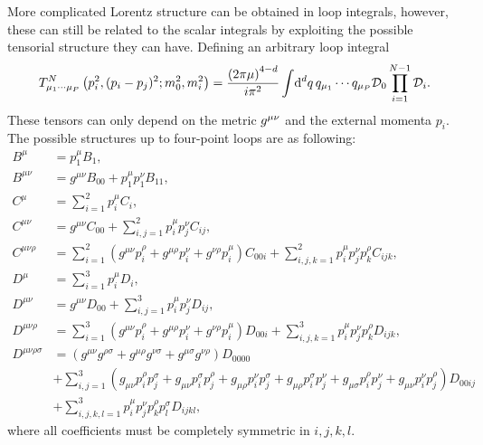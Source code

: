 \documentclass[../main.tex]{subfiles}
\begin{document}
More complicated Lorentz structure can be obtained in loop integrals, however,
these can still be related to the scalar integrals by exploiting the possible
tensorial structure they can have. Defining an arbitrary loop integral
\begin{equation}
  T^N_{\mu_1\cdots\mu_P}\left(p_i^2, (p_i-p_j)^2; m_0^2, m_i^2\right) =
  \frac{\left(2\pi \mu\right)^{4-d}}{i \pi^2} \int \!\mathrm{d}^d q\, q_{\mu_1}\cdots
  q_{\mu_P} \mathcal{D}_0 \prod_{i=1}^{N-1} \mathcal{D}_i.
\end{equation}
These tensors can only depend on the metric \(\tensor{g}{^\mu^\nu}\) and the
external momenta \(p_i\).
The possible structures up to four-point loops are as following:
\begin{subequations}
  \begin{align}
    B^\mu                & = p_1^\mu B_1,
    \\
    B^{\mu\nu}           & = g^{\mu\nu} B_{00} + p_1^\mu p_1^\nu B_{11},
    \\
    C^\mu                & = \sum_{i=1}^2 p_i^\mu C_i,
    \\
    C^{\mu\nu}           & = g^{\mu\nu} C_{00} + \sum_{i,j=1}^{2} p_i^\mu
    p_j^\nu C_{ij},
    \\
    C^{\mu\nu\rho}       & = \sum_{i=1}^2 (g^{\mu\nu} p_i^{\rho} +
    g^{\mu\rho} p_i^{\nu} + g^{\nu\rho} p_i^{\mu}) C_{00i} +
    \sum_{i,j,k=1}^2
    p_i^\mu p_j^\nu p_k^\rho C_{ijk},
    \\
    D^\mu                & = \sum_{i=1}^3 p_i^\mu D_i,
    \\
    D^{\mu\nu}           & = g^{\mu\nu} D_{00} + \sum_{i,j=1}^{3} p_i^\mu
    p_j^\nu D_{ij},
    \\
    D^{\mu\nu\rho}       & = \sum_{i=1}^3 (g^{\mu\nu} p_i^{\rho} +
    g^{\mu\rho} p_i^{\nu} + g^{\nu\rho} p_i^{\mu}) D_{00i} +
    \sum_{i,j,k=1}^3
    p_i^\mu p_j^\nu p_k^\rho D_{ijk},
    \\
    \nonumber
    D^{\mu\nu\rho\sigma} & = (g^{\mu\nu}g^{\rho\sigma} +
    g^{\mu\rho}g^{\nu\sigma} + g^{\mu\sigma}g^{\nu\rho})D_{0000}
    \\
    \nonumber
                         & + \sum_{i,j=1}^3 (g_{\mu\nu}p_i^\rho p_j^\sigma
    + g_{\mu\nu}p_i^\sigma p_j^\rho + g_{\mu\rho}p_i^\nu p_j^\sigma +
    g_{\mu\rho}p_i^\sigma p_j^\nu + g_{\mu\sigma}p_i^\rho p_j^\nu +
    g_{\mu\nu}p_i^\nu p_j^\rho) D_{00ij}
    \\
                         & + \sum_{i,j,k,l=1}^3 p_i^\mu p_j^\nu p_k^\rho
    p_l^\sigma D_{ijkl},
  \end{align}
\end{subequations}
where all coefficients must be completely symmetric in \(i,j,k,l\).
\end{document}
